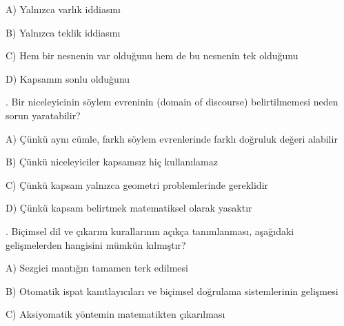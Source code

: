 \par\noindent\hspace*{1.6em}A) Yalnızca varlık iddiasını

\par\noindent\hspace*{1.6em}B) Yalnızca teklik iddiasını

\par\noindent\hspace*{1.6em}C) Hem bir nesnenin var olduğunu hem de bu nesnenin tek olduğunu

\par\noindent\hspace*{1.6em}D) Kapsamın sonlu olduğunu

\par\smallskip{}. Bir niceleyicinin söylem evreninin (domain of discourse) belirtilmemesi neden sorun yaratabilir?

\par\noindent\hspace*{1.6em}A) Çünkü aynı cümle, farklı söylem evrenlerinde farklı doğruluk değeri alabilir

\par\noindent\hspace*{1.6em}B) Çünkü niceleyiciler kapsamsız hiç kullanılamaz

\par\noindent\hspace*{1.6em}C) Çünkü kapsam yalnızca geometri problemlerinde gereklidir

\par\noindent\hspace*{1.6em}D) Çünkü kapsam belirtmek matematiksel olarak yasaktır

\par\smallskip{}. Biçimsel dil ve çıkarım kurallarının açıkça tanımlanması, aşağıdaki gelişmelerden hangisini mümkün kılmıştır?

\par\noindent\hspace*{1.6em}A) Sezgici mantığın tamamen terk edilmesi

\par\noindent\hspace*{1.6em}B) Otomatik ispat kanıtlayıcıları ve biçimsel doğrulama sistemlerinin gelişmesi

\par\noindent\hspace*{1.6em}C) Aksiyomatik yöntemin matematikten çıkarılması

